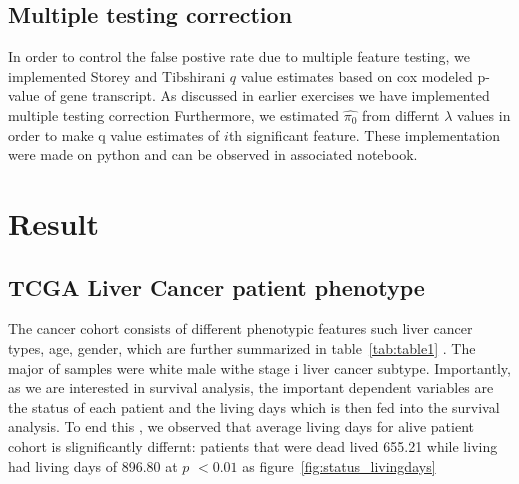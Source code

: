 \documentclass[9pt,twocolumn,twoside]{article}
\begin{document}
	\subsection {Multiple testing correction}
	In order to control the false postive rate due to multiple feature testing, we implemented Storey and Tibshirani \cite{storey2003statistical} $q$ value estimates based on cox modeled p-value of gene transcript. As discussed in earlier exercises we have  implemented multiple testing correction Furthermore, we estimated $\hat {\pi_0}$ from differnt $\lambda$ values in order to make q value estimates  of $i$th significant feature. These implementation were made on python and can be observed in associated notebook.

\section{Result}

\subsection {TCGA Liver Cancer patient phenotype}
 
The cancer cohort consists of different phenotypic features such liver cancer types, age, gender, which are further summarized in table~\ref{tab:table1} . The major of samples were white male withe stage i liver cancer subtype. Importantly, as we are interested in survival analysis, the  important dependent variables are the status of each patient  and the  living days which is then fed into the survival analysis. To end this , we observed that average living days for alive  patient cohort is slignificantly differnt: patients that were dead lived  655.21 while living had living days of 896.80 at $p$ $< 0.01$ as figure~\ref{fig:status_livingdays}
 
\end{document}
